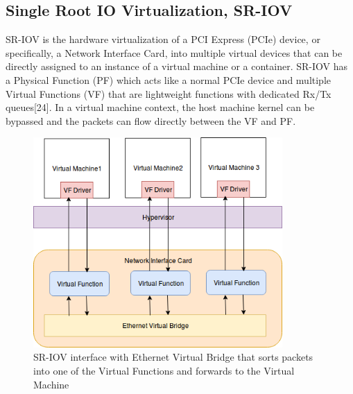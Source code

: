 \documentclass[english, 12pt, a4paper, elec, utf8, a-1b, online]{aaltothesis}
\begin{document}
\subsection{Single Root IO Virtualization, SR-IOV}
SR-IOV is the hardware virtualization of a PCI Express (PCIe) device, or specifically, a Network Interface Card, into multiple virtual devices that can be directly assigned to an instance of a virtual machine or a container. SR-IOV has a Physical Function (PF) which acts like a normal PCIe device and multiple Virtual Functions (VF) that are lightweight functions with dedicated Rx/Tx queues[24]. In a virtual machine context, the host machine kernel can be bypassed and the packets can flow directly between the VF and PF.

\begin{figure}[htb]
\begin{center}
\includegraphics[height=8cm]{pics/SRIOV-VF.png}
\end{center}
\caption{SR-IOV interface with Ethernet Virtual Bridge that sorts packets into one of the Virtual Functions and forwards to the Virtual Machine}
\label{fig-sriov}
\end{figure}
\end{document}
